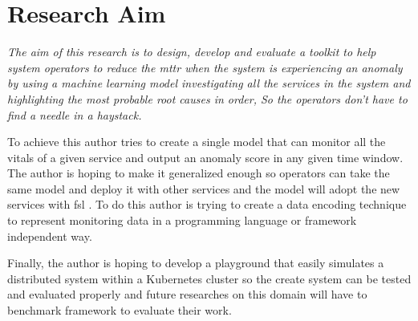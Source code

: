 
{\let\clearpage\relax\chapter{Research Aim}}

\textit{The aim of this research is to design, develop and evaluate a toolkit to help system operators to reduce the \ac{mttr} when the system is experiencing an anomaly by using a machine learning model investigating all the services in the system and highlighting the most probable root causes in order, So the operators don't have to find a needle in a haystack.}

To achieve this author tries to create a single model that can monitor all the vitals of a given service and output an anomaly score in any given time window. The author is hoping to make it generalized enough so operators can take the same model and deploy it with other services and the model will adopt the new services with \ac{fsl} \citep{wang2020generalizing}. To do this author is trying to create a data encoding technique to represent monitoring data in a programming language or framework independent way.

Finally, the author is hoping to develop a playground that easily simulates a distributed system within a Kubernetes cluster so the create system can be tested and evaluated properly and future researches on this domain will have to benchmark framework to evaluate their work.
